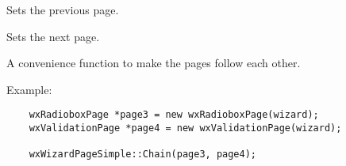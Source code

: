 \label{wxwizardpagesimplesetprev}


Sets the previous page.

\label{wxwizardpagesimplesetnext}


Sets the next page.

\label{wxwizardpagesimplechain}


A convenience function to make the pages follow each other.

Example:

\begin{verbatim}
    wxRadioboxPage *page3 = new wxRadioboxPage(wizard);
    wxValidationPage *page4 = new wxValidationPage(wizard);

    wxWizardPageSimple::Chain(page3, page4);
\end{verbatim}

